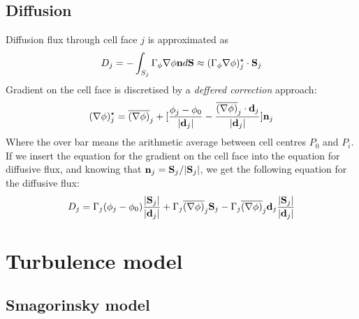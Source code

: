 \documentclass[10pt]{article}
\begin{document}
    \subsection{Diffusion}

    Diffusion flux through cell face $j$ is approximated as
    \begin{equation}
      D_j = - \int_{S_j} \Gamma_\phi \nabla \phi {\bf n} d {\bf S}
             \approx
             (\Gamma_{\phi} {\nabla \phi})_j^\star \cdot {\bf S}_j  
    \end{equation}
    Gradient on the cell face is discretised by a {\em deffered
    correction} approach:
    \begin{equation}
      ({\nabla \phi})_j^\star = 
      \overline{ ({\nabla \phi}) }_j  + 
      [
          \frac{ \phi_j - \phi_0}  
               {| {\bf d}_j |} 
        - \frac{ \overline{ ({\nabla \phi}) }_j \cdot {\bf d}_j } 
               {| {\bf d}_j |} 
      ] 
      {\bf n}_j
    \end{equation}
    Where the over bar means the arithmetic average between cell
    centres $P_0$ and $P_i$. If we insert the equation for the
    gradient on the cell face into the equation for diffusive
    flux, and knowing that ${\bf n}_j ={\bf S}_j / |{\bf S}_j|$,
    we get the following equation for the diffusive flux: 
    \begin{equation}
      D_j = 
      \Gamma_j (\phi_j - \phi_0) \frac{|{\bf S}_j|}{|{\bf d}_j|}
      +
      \Gamma_j 
      \overline{ ({\nabla \phi}) }_j {\bf S}_j 
      -
      \Gamma_j 
      \overline{ ({\nabla \phi}) }_j  
      {{\bf d}_j} \frac{|{\bf S}_j|}{|{\bf d}_j|}
    \end{equation}
 
%
    \newpage
    \section{Turbulence model}
%

    \subsection{Smagorinsky model}
\end{document}

